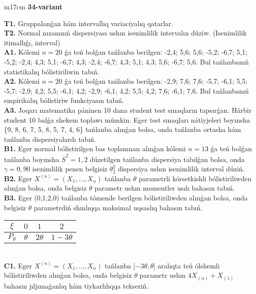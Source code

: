 \documentclass{article}
\begin{document}
\vspace{1cm}


\begin{tabular}{m{17cm}}
\textbf{34-variant}
\newline

\textbf{T1.} 
Gruppalanǵan hám intervallıq variaciyalıq qatarlar.
 \\
\textbf{T2.} 
Normal nızamnıń dispersiyası ushın isenimlilik intervalın dúziw. (Isenimlilik itimallıǵı, interval)
 \\
\textbf{A1.} 
Kólemi \(n = 20\) ǵa teń bolǵan tańlanba berilgen: -2,4; 5,6; 5,6; -5,2; -6,7; 5,1; -5,2; -2,4; 4,3; 5,1; -6,7; 4,3; -2,4; -6,7; 4,3; 5,1; 4,3; 5,6; -6,7; 5,6. Bul tańlanbanıń statistikalıq bólistiriliwin tabıń.
 \\
\textbf{A2.} 
Kólemi \(n = 20\) ǵa teń bolǵan tańlanba berilgen: -2,9; 7,6; 7,6; -5,7; -6,1; 5,5; -5,7; -2,9; 4,2; 5,5; -6,1; 4,2; -2,9; -6,1; 4,2; 5,5; 4,2; 7,6; -6,1; 7,6. Bul tańlanbanıń empirikalıq bólistiriw funkciyasın tabıń.
 \\
\textbf{A3.} 
Joqarı matematika páninen 10 dana student test sınaqların tapsırǵan. Hárbir student 10 balǵa shekem toplawı múmkin. Eger test sınaqları nátiyjeleri boyınsha \{9, 8, 6, 7, 5, 8, 5, 7, 4, 6\} tańlanba alınǵan bolsa, onda tańlanba ortasha hám tańlanba dispersiyalardı tabıń.
 \\
\textbf{B1.} 
Eger normal bólistirilgen bas toplamnan alınǵan kólemi \(n = 13\) ǵa teń bolǵan tańlanba boyınsha \({\overline{S}}^{2} = 1,2\) dúzetilgen tańlanba dispersiya tabılǵan bolsa, onda \(\gamma = 0,90\) isenimlilik penen belgisiz \(\theta_{2}^{2}\) dispersiya ushın isenimlilik interval dúziń.
 \\
\textbf{B2.} 
Eger \(X^{(n)} = \left( X_{1},...,X_{n} \right)\) tańlanba \(\theta\) parametrli kórsetkishli bólistiriliwden alınǵan bolsa, onda belgisiz \(\theta\) parametr ushın momentler usılı bahasın tabıń.
 \\
\textbf{B3.} 
Eger (0,1,2,0) tańlanba tómende berilgen bólistiriliwden alınǵan bolsa, onda belgisiz \(\theta\) parametrdiń shınlıqqa maksimal uqsaslıq bahasın tabıń.
\begin{tabular}{|c|c|c|c|}
  \hline
$\xi$
&
$0$
&
$1$
&
$2$\\
\hline
\(P_{\theta}\) & \(\theta\) & \(2\theta\) & \(1 - 3\theta\) \\
\hline
\end{tabular}
 \\
\textbf{C1.} 
Eger \(X^{(n)} = \left( X_{1},...,X_{n} \right)\) tańlanba \(\lbrack - 3\theta,\theta\rbrack\) aralıqta teń ólshemli bólistiriliwden alınǵan bolsa, onda belgisiz \(\theta\) parametr ushın \(4X_{(n)} + X_{(1)}\) bahasın jıljımaǵanlıq hám tiykarlılıqqa tekseriń.

\end{tabular}
\end{document}

